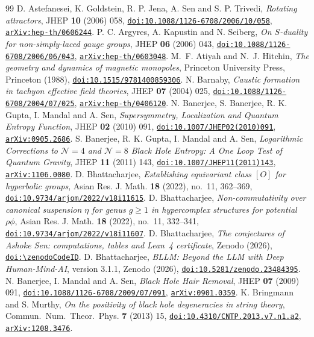 \begin{thebibliography}{99}
\providecommand{\doilink}[1]{\href{https://doi.org/#1}{\nolinkurl{doi:#1}}}
\providecommand{\arxivlink}[1]{\href{https://arxiv.org/abs/#1}{\nolinkurl{arXiv:#1}}}
 D. Astefanesei, K. Goldstein, R. P. Jena, A. Sen and S. P. Trivedi, \emph{Rotating attractors}, JHEP \textbf{10} (2006) 058, \doilink{10.1088/1126-6708/2006/10/058}, \arxivlink{hep-th/0606244}.
 P. C. Argyres, A. Kapustin and N. Seiberg, \emph{On $S$-duality for non-simply-laced gauge groups}, JHEP \textbf{06} (2006) 043, \doilink{10.1088/1126-6708/2006/06/043}, \arxivlink{hep-th/0603048}.
 M.~F. Atiyah and N.~J. Hitchin, \emph{The geometry and dynamics of magnetic monopoles}, Princeton University Press, Princeton (1988), \doilink{10.1515/9781400859306}.
 N. Barnaby, \emph{Caustic formation in tachyon effective field theories}, JHEP \textbf{07} (2004) 025, \doilink{10.1088/1126-6708/2004/07/025}, \arxivlink{hep-th/0406120}.
 N. Banerjee, S. Banerjee, R. K. Gupta, I. Mandal and A. Sen, \emph{Supersymmetry, Localization and Quantum Entropy Function}, JHEP \textbf{02} (2010) 091, \doilink{10.1007/JHEP02(2010)091}, \arxivlink{0905.2686}.
 S. Banerjee, R. K. Gupta, I. Mandal and A. Sen, \emph{Logarithmic Corrections to $\mathcal N=4$ and $\mathcal N=8$ Black Hole Entropy: A One Loop Test of Quantum Gravity}, JHEP \textbf{11} (2011) 143, \doilink{10.1007/JHEP11(2011)143}, \arxivlink{1106.0080}.
 D. Bhattacharjee, \emph{Establishing equivariant class $[O]$ for hyperbolic groups}, Asian Res. J. Math. \textbf{18} (2022), no.~11, 362--369, \doilink{10.9734/arjom/2022/v18i11615}.
 D. Bhattacharjee, \emph{Non-commutativity over canonical suspension $\eta$ for genus $g\ge1$ in hypercomplex structures for potential $\rho\phi$}, Asian Res. J. Math. \textbf{18} (2022), no.~11, 332--341, \doilink{10.9734/arjom/2022/v18i11607}.
 D. Bhattacharjee, \emph{The conjectures of Ashoke Sen: computations, tables and Lean~4 certificate}, Zenodo (2026), \href{https://doi.org/\zenodoCodeID}{\nolinkurl{doi:\zenodoCodeID}}.
 D. Bhattacharjee, \emph{BLLM: Beyond the LLM with Deep Human-Mind-AI}, version 3.1.1, Zenodo (2026), \doilink{10.5281/zenodo.23484395}.
 N. Banerjee, I. Mandal and A. Sen, \emph{Black Hole Hair Removal}, JHEP \textbf{07} (2009) 091, \doilink{10.1088/1126-6708/2009/07/091}, \arxivlink{0901.0359}.
 K. Bringmann and S. Murthy, \emph{On the positivity of black hole degeneracies in string theory}, Commun.\ Num.\ Theor.\ Phys. \textbf{7} (2013) 15, \doilink{10.4310/CNTP.2013.v7.n1.a2}, \arxivlink{1208.3476}.

\end{thebibliography}

